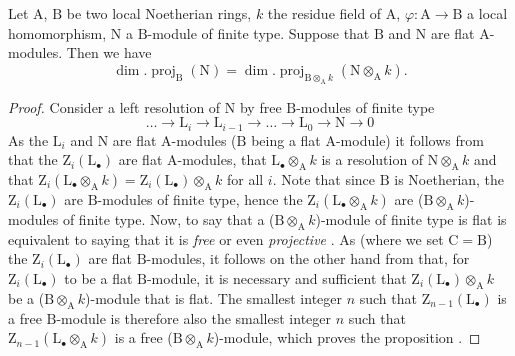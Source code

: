 \begin{proposition}[6.2.3]
\label{IV.6.2.3}
Let $\mathrm{A}$, $\mathrm{B}$ be two local Noetherian rings, $k$ the residue field of $\mathrm{A}$, $\varphi:\mathrm{A}\to\mathrm{B}$ a local homomorphism, $\mathrm{N}$ a $\mathrm{B}$-module of finite type.
Suppose that $\mathrm{B}$ and $\mathrm{N}$ are flat $\mathrm{A}$-modules.
Then we have
\begin{equation}
  \dim.\operatorname{proj}_\mathrm{B}(\mathrm{N})=\dim.\operatorname{proj}_{\mathrm{B}\otimes_\mathrm{A} k}(\mathrm{N}\otimes_\mathrm{A} k).
  \label{IV.6.2.3.1}
\tag{6.2.3.1}
\end{equation}
\end{proposition}

\begin{proof}
Consider a left resolution of $\mathrm{N}$ by free $\mathrm{B}$-modules of finite type
\[
  \ldots\to\mathrm{L}_i\to\mathrm{L}_{i-1}\to\ldots\to\mathrm{L}_0\to\mathrm{N}\to 0
\]
As the $\mathrm{L}_i$ and $\mathrm{N}$ are flat $\mathrm{A}$-modules ($\mathrm{B}$ being a flat $\mathrm{A}$-module) it follows from  that the $\mathrm{Z}_i(\mathrm{L}_\bullet)$ are flat $\mathrm{A}$-modules, that $\mathrm{L}_\bullet\otimes_\mathrm{A} k$ is a resolution of $\mathrm{N}\otimes_\mathrm{A} k$ and that $\mathrm{Z}_i(\mathrm{L}_\bullet\otimes_\mathrm{A} k)=\mathrm{Z}_i(\mathrm{L}_\bullet)\otimes_\mathrm{A} k$ for all $i$.
Note that since $\mathrm{B}$ is Noetherian, the $\mathrm{Z}_i(\mathrm{L}_\bullet)$ are $\mathrm{B}$-modules of finite type, hence the $\mathrm{Z}_i(\mathrm{L}_\bullet\otimes_\mathrm{A} k)$ are ($\mathrm{B}\otimes_\mathrm{A} k$)-modules of finite type.
Now, to say that a ($\mathrm{B}\otimes_\mathrm{A} k$)-module of finite type is flat is equivalent to saying that it is \emph{free} or even \emph{projective} .
As (where we set $\mathrm{C}=\mathrm{B}$) the $\mathrm{Z}_i(\mathrm{L}_\bullet)$ are flat $\mathrm{B}$-modules, it follows on the other hand from  that, for $\mathrm{Z}_i(\mathrm{L}_\bullet)$ to be a flat $\mathrm{B}$-module, it is necessary and sufficient that $\mathrm{Z}_i(\mathrm{L}_\bullet)\otimes_\mathrm{A} k$ be a ($\mathrm{B}\otimes_\mathrm{A} k$)-module that is flat.
The smallest integer $n$ such that $\mathrm{Z}_{n-1}(\mathrm{L}_\bullet)$ is a free $\mathrm{B}$-module is therefore also the smallest integer $n$ such that $\mathrm{Z}_{n-1}(\mathrm{L}_\bullet\otimes_\mathrm{A} k)$ is a free ($\mathrm{B}\otimes_\mathrm{A} k$)-module, which proves the proposition .
\end{proof}

